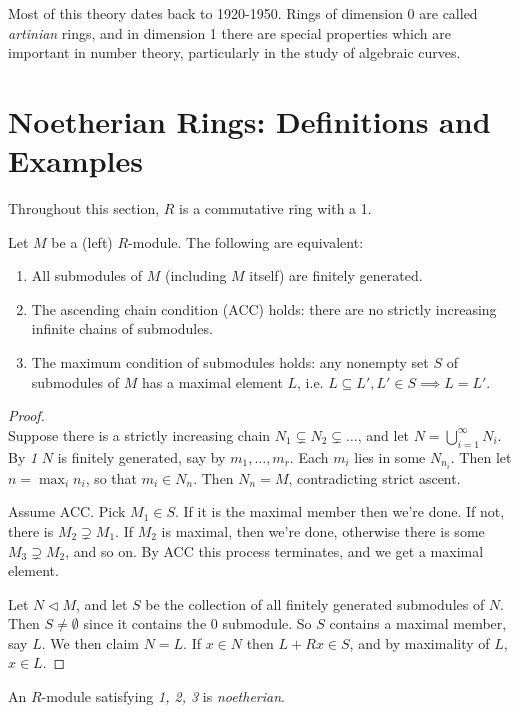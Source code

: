 \documentclass[10pt,a4paper]{article}
\begin{document}
Most of this theory dates back to 1920-1950. Rings of dimension 0 are called \emph{artinian} rings, and in dimension 1 there are special properties which are important in number theory, particularly in the study of algebraic curves.

\section{Noetherian Rings: Definitions and Examples}
Throughout this section, $R$ is a commutative ring with a 1.

\begin{lemma}
Let $M$ be a (left) $R$-module. The following are equivalent:
\begin{enumerate}
\item All submodules of $M$ (including $M$ itself) are finitely generated.
\item The ascending chain condition (ACC) holds: there are no strictly increasing infinite chains of submodules.
\item The maximum condition of submodules holds: any nonempty set $S$ of submodules of $M$ has a maximal element $L$, i.e. $L \subseteq L', L' \in S \implies L = L'$.
\end{enumerate}
\end{lemma}
\begin{proof}\hspace*{0cm}\\
 Suppose there is a strictly increasing chain $N_1 \subsetneq N_2 \subsetneq \ldots$, and let $N = \bigcup_{i=1}^\infty N_i$. By \textit{1} $N$ is finitely generated, say by $m_1, \ldots, m_r$. Each $m_i$ lies in some $N_{n_i}$. Then let $n = \max_i n_i$, so that $m_i \in N_n$. Then $N_n = M$, contradicting strict ascent.

 Assume ACC. Pick $M_1 \in S$. If it is the maximal member then we're done. If not, there is $M_2 \supsetneq M_1$. If $M_2$ is maximal, then we're done, otherwise there is some $M_3 \supsetneq M_2$, and so on. By ACC this process terminates, and we get a maximal element.

 Let $N \triangleleft M$, and let $S$ be the collection of all finitely generated submodules of $N$. Then $S \neq \emptyset$ since it contains the 0 submodule. So $S$ contains a maximal member, say $L$. We then claim $N = L$. If $x \in N$ then $L+Rx \in S$, and by maximality of $L$, $x \in L$.
\end{proof}

\begin{definition}
An $R$-module satisfying \textit{1, 2, 3} is \emph{noetherian}.
\end{definition}
\end{document}
